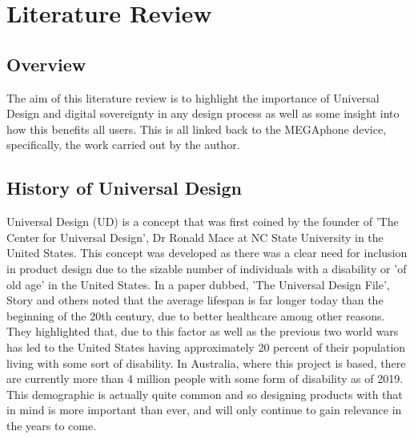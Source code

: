 
\chapter{Literature Review} %

\label{Chapter2} %


\section{Overview}  
The aim of this literature review is to highlight the importance of Universal Design and digital sovereignty in any design process as well as some insight into how this benefits all users. 
This is all linked back to the MEGAphone device, specifically, the work carried out by the author. %


\section{History of Universal Design}
Universal Design (UD) is a concept that was first coined by the founder of 'The Center for Universal Design', Dr Ronald Mace at NC State University in the United States\cite{ronald}.
This concept was developed as there was a clear need for inclusion in product design due to the sizable number of individuals with a disability or 'of old age' in the United States. %
In a paper dubbed, 'The Universal Design File'\cite{universalfile}, Story and others noted that the average lifespan is far longer today than the beginning of the 20th century, due to better healthcare among other reasons.
They highlighted that, due to this factor as well as the previous two world wars has led to the United States having approximately 20 percent of their population living with some sort of disability.
In Australia, where this project is based, there are currently more than 4 million people with some form of disability \cite{ausstats} as of 2019.
This demographic is actually quite common and so designing products with that in mind is more important than ever, and will only continue to gain relevance in the years to come.

